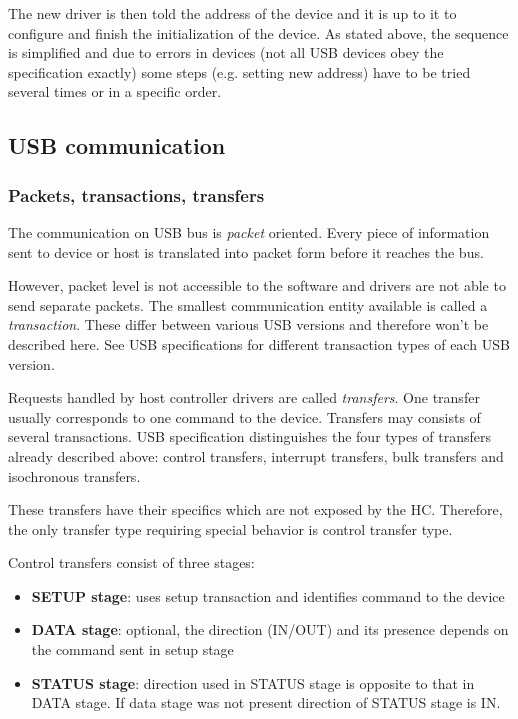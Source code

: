 The new driver is then told the address of the device and it is up to it to
configure and finish the initialization of the device.
As stated above, the sequence is simplified and due to errors in devices (not
all USB devices obey the specification exactly) some steps (e.g. setting new
address) have to be tried several times or in a specific order.

\subsection{USB communication}

\subsubsection{Packets, transactions, transfers}

The communication on USB bus is \textit{packet} oriented. Every piece of
information sent to device or host is translated into packet form before it
reaches the bus.

However, packet level is not accessible to the software and drivers are not
able to send separate packets. The smallest communication entity available is
called a \textit{transaction}. These differ between various USB versions and
therefore won't be described here. See USB specifications for different
transaction types of each USB version.

Requests handled by host controller drivers are called \textit{transfers}. One
transfer usually corresponds to one command to the device. Transfers may
consists of several transactions. USB specification distinguishes the four
types of transfers already described above: control transfers, interrupt
transfers, bulk transfers and isochronous transfers.

These transfers have their specifics which are not exposed by the HC.
Therefore, the only transfer type requiring special behavior is control
transfer type.

Control transfers consist of three stages:
\begin{itemize}
\item \textbf{SETUP stage}: uses setup transaction and identifies command to
the device
\item \textbf{DATA stage}: optional, the direction (IN/OUT) and its presence
depends on the command sent in setup stage
\item \textbf{STATUS stage}: direction used in STATUS stage is opposite to that
in DATA stage. If data stage was not present direction of STATUS stage is IN.
\end{itemize}

